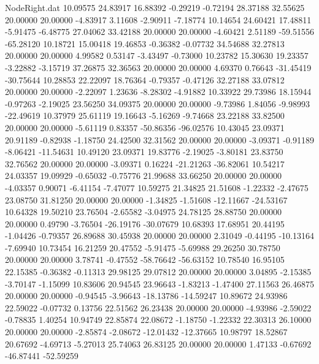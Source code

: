 \begin{filecontents}{NodeRight.dat}
  10.09575   24.83917   16.88392    -0.29219   -0.72194   28.37188   32.55625   20.00000   20.00000   -4.83917    3.11608   -2.90911   -7.18774
  10.14654   24.60421   17.48811    -5.91475   -6.48775   27.04062   33.42188   20.00000   20.00000   -4.60421    2.51189  -59.51556  -65.28120
  10.18721   15.00418   19.46853    -0.36382   -0.07732   34.54688   32.27813   20.00000   20.00000    4.99582    0.53147   -3.43497   -0.73000
  10.23782   15.30630   19.23357    -3.22882   -3.15719   37.26875   32.36563   20.00000   20.00000    4.69370    0.76643  -31.45419  -30.75644
  10.28853   22.22097   18.76364    -0.79357   -0.47126   32.27188   33.07812   20.00000   20.00000   -2.22097    1.23636   -8.28302   -4.91882
  10.33922   29.73986   18.15944    -0.97263   -2.19025   23.56250   34.09375   20.00000   20.00000   -9.73986    1.84056   -9.98993  -22.49619
  10.37979   25.61119   19.16643    -5.16269   -9.74668   23.22188   33.82500   20.00000   20.00000   -5.61119    0.83357  -50.86356  -96.02576
  10.43045   23.09371   20.91189    -0.82938   -1.18750   24.42500   32.31562   20.00000   20.00000   -3.09371   -0.91189   -8.06421  -11.54631
  10.49120   23.09371   19.83776    -2.19025   -3.80181   23.83750   32.76562   20.00000   20.00000   -3.09371    0.16224  -21.21263  -36.82061
  10.54217   24.03357   19.09929    -0.65032   -0.75776   21.99688   33.66250   20.00000   20.00000   -4.03357    0.90071   -6.41154   -7.47077
  10.59275   21.34825   21.51608    -1.22332   -2.47675   23.08750   31.81250   20.00000   20.00000   -1.34825   -1.51608  -12.11667  -24.53167
  10.64328   19.50210   23.76504    -2.65582   -3.04975   24.78125   28.88750   20.00000   20.00000    0.49790   -3.76504  -26.19176  -30.07679
  10.68393   17.68951   20.44195    -1.04426   -0.79357   26.89688   30.45938   20.00000   20.00000    2.31049   -0.44195  -10.13164   -7.69940
  10.73454   16.21259   20.47552    -5.91475   -5.69988   29.26250   30.78750   20.00000   20.00000    3.78741   -0.47552  -58.76642  -56.63152
  10.78540   16.95105   22.15385    -0.36382   -0.11313   29.98125   29.07812   20.00000   20.00000    3.04895   -2.15385   -3.70147   -1.15099
  10.83606   20.94545   23.96643    -1.83213   -1.47400   27.11563   26.46875   20.00000   20.00000   -0.94545   -3.96643  -18.13786  -14.59247
  10.89672   24.93986   22.59022    -0.07732    0.13756   22.51562   26.23438   20.00000   20.00000   -4.93986   -2.59022   -0.78835    1.40254
  10.94749   22.85874   22.08672    -1.18750   -1.22332   22.30313   26.10000   20.00000   20.00000   -2.85874   -2.08672  -12.01432  -12.37665
  10.98797   18.52867   20.67692    -4.69713   -5.27013   25.74063   26.83125   20.00000   20.00000    1.47133   -0.67692  -46.87441  -52.59259

\end{filecontents}
